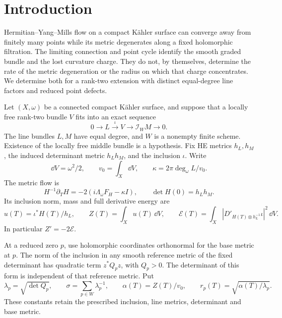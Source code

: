 \section{Introduction}

Hermitian--Yang--Mills flow on a compact Kähler surface can
converge away from finitely many points while its metric
degenerates along a fixed holomorphic filtration. The
limiting connection and point cycle identify the smooth
graded bundle and the lost curvature charge. They do
not, by themselves, determine the rate of the metric
degeneration or the radius on which that charge
concentrates. We determine both for a rank-two
extension with distinct equal-degree line factors
and reduced point defects.

Let \((X,\omega)\) be a connected compact Kähler surface,
and suppose that a locally free rank-two bundle \(V\)
fits into an exact sequence
\begin{equation}\label{eq:intro-extension}
 0\longrightarrow L\xrightarrow{\iota}V
       \longrightarrow\mathcal I_WM\longrightarrow0 .
\end{equation}
The line bundles \(L,M\) have equal degree, and \(W\)
is a nonempty finite scheme. Existence of the locally
free middle bundle is a hypothesis. Fix HE metrics
\(h_L,h_M\), the induced determinant metric \(h_Lh_M\),
and the inclusion \(\iota\). Write
\[
 \dd V=\omega^2/2,\qquad v_0=\int_X\dd V,\qquad
 \kappa=2\pi\deg_\omega L/v_0 .
\]
The metric flow is
\[
 H^{-1}\partial_TH=-2(i\Lambda_\omega F_H-\kappa I),
 \qquad \det H(0)=h_Lh_M .
\]
Its inclusion norm, mass and full derivative energy are
\begin{equation}\label{eq:intro-observables}
 u(T)=\iota^*H(T)/h_L,\qquad
 Z(T)=\int_Xu(T)\,\dd V,\qquad
 \mathcal E(T)=\int_X|D'_{H(T)\otimes h_L^{-1}}\iota|^2\,\dd V .
\end{equation}
In particular \(Z'=-2\mathcal E\).

At a reduced zero \(p\), use holomorphic coordinates
orthonormal for the base metric at \(p\). The norm
of the inclusion in any smooth reference metric
of the fixed determinant has quadratic term \(z^*Q_pz\),
with \(Q_p>0\). The determinant of this form is
independent of that reference metric. Put
\begin{equation}\label{eq:intro-constants}
 \lambda_p=\sqrt{\det Q_p},\qquad
 \sigma=\sum_{p\in W}\lambda_p^{-1},\qquad
 \alpha(T)=Z(T)/v_0,\qquad
 r_p(T)=\sqrt{\alpha(T)/\lambda_p}.
\end{equation}
These constants retain the prescribed inclusion,
line metrics, determinant and base metric.

